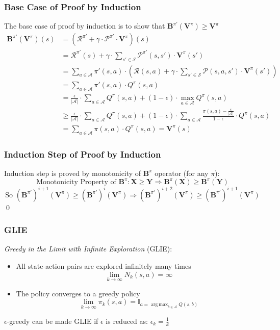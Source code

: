 \documentclass[handout]{beamer}
\DeclareMathOperator*{\argmax}{arg\,max}
\newcommand{\bvpi}{\bm{V}^{\pi}}
\begin{document}
\begin{frame}
\frametitle{Base Case of Proof by Induction}
\pause
The base case of proof by induction is to show that $\bm{B}^{\pi'}(\bvpi)  \geq  \bm{V}^{\pi}$
\pause
\begin{align*}
\bm{B}^{\pi'}(\bvpi)(s) & = (\bm{\mathcal{R}}^{\pi'} + \gamma \cdot \bm{\mathcal{P}}^{\pi'} \cdot \bvpi)(s) \\
& = \bm{\mathcal{R}}^{\pi'}(s) + \gamma \cdot \sum_{s' \in \mathcal{S}} \bm{\mathcal{P}}^{\pi'}(s,s') \cdot \bvpi(s') \\
& = \sum_{a \in \mathcal{A}} \pi'(s, a) \cdot (\mathcal{R}(s,a) + \gamma \cdot \sum_{s' \in \mathcal{S}} \mathcal{P}(s,a,s') \cdot \bvpi(s')) \\
& = \sum_{a \in \mathcal{A}} \pi'(s, a) \cdot Q^{\pi}(s,a) \\
& = \frac {\epsilon} {|\mathcal{A}|} \cdot \sum_{a \in \mathcal{A}} Q^{\pi}(s,a) + (1 - \epsilon) \cdot \max_{a \in \mathcal{A}} Q^{\pi}(s,a) \\
& \geq \frac {\epsilon} {|\mathcal{A}|} \cdot \sum_{a \in \mathcal{A}} Q^{\pi}(s,a) + (1 - \epsilon) \cdot \sum_{a \in \mathcal{A}} \frac {\pi(s,a) - \frac {\epsilon} {|\mathcal{A}|}} {1 - \epsilon} \cdot Q^{\pi}(s,a) \\
& = \sum_{a \in \mathcal{A}} \pi(s,a) \cdot Q^{\pi}(s,a) = \bm{V}^{\pi}(s)
\end{align*}
\end{frame}

\begin{frame}
\frametitle{Induction Step of Proof by Induction}
\pause
Induction step is proved by monotonicity of $\bm{B}^{\pi}$ operator (for any $\pi$):
\pause
$$\text{Monotonicity Property of } \bm{B}^{\pi}: \bm{X} \geq \bm{Y} \Rightarrow \bm{B}^{\pi}(\bm{X}) \geq \bm{B}^{\pi}(\bm{Y})$$
\pause
$$\text{So } (\bm{B}^{\pi'})^{i+1}(\bvpi) \geq (\bm{B}^{\pi'})^i(\bvpi) \Rightarrow (\bm{B}^{\pi'})^{i+2}(\bvpi) \geq (\bm{B}^{\pi'})^{i+1}(\bvpi)$$
\qed
\end{frame}


\begin{frame}
\frametitle{GLIE}
\pause
\begin{definition}
{\em Greedy in the Limit with Infinite Exploration} (GLIE):
\pause
\begin{itemize}[<+->]
\item  All state-action pairs are explored infinitely many times
$$\lim_{k \rightarrow \infty} N_k(s,a) = \infty$$
\item The policy converges to a greedy policy
$$\lim_{k\rightarrow \infty} \pi_k(s,a) = \mathbb{I}_{a = \argmax_{b \in \mathcal{A}} Q(s,b)}$$
\end{itemize}
\end{definition}
\pause
$\epsilon$-greedy can be made GLIE if $\epsilon$ is reduced as: $\epsilon_k = \frac 1 k$
\end{frame}
\end{document}

